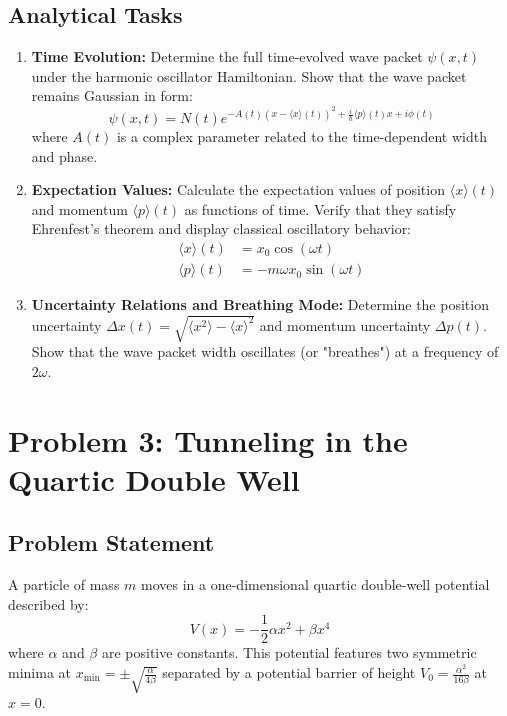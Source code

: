 \documentclass[11pt,a4paper]{article}
\begin{document}
\subsection*{Analytical Tasks}
\begin{enumerate}[label=\textbf{\arabic*.}]
    \item \textbf{Time Evolution:} Determine the full time-evolved wave packet $\psi(x,t)$ under the harmonic oscillator Hamiltonian. Show that the wave packet remains Gaussian in form:
    \begin{equation}
        \psi(x,t) = N(t) e^{-A(t)(x - \langle x \rangle(t))^2 + \frac{i}{\hbar} \langle p \rangle(t) x + i \phi(t)}
    \end{equation}
    where $A(t)$ is a complex parameter related to the time-dependent width and phase.

    \item \textbf{Expectation Values:} Calculate the expectation values of position $\langle x \rangle(t)$ and momentum $\langle p \rangle(t)$ as functions of time. Verify that they satisfy Ehrenfest's theorem and display classical oscillatory behavior:
    \begin{align}
        \langle x \rangle(t) &= x_0 \cos(\omega t) \\
        \langle p \rangle(t) &= -m\omega x_0 \sin(\omega t)
    \end{align}

    \item \textbf{Uncertainty Relations and Breathing Mode:} 
    Determine the position uncertainty $\Delta x(t) = \sqrt{\langle x^2 \rangle - \langle x \rangle^2}$ and momentum uncertainty $\Delta p(t)$. Show that the wave packet width oscillates (or "breathes") at a frequency of $2\omega$.
\end{enumerate}

\newpage

\section{Problem 3: Tunneling in the Quartic Double Well}
\label{sec:problem3}

\subsection*{Problem Statement}
A particle of mass $m$ moves in a one-dimensional quartic double-well potential described by:
\begin{equation}
    V(x) = -\frac{1}{2}\alpha x^2 + \beta x^4
\end{equation}
where $\alpha$ and $\beta$ are positive constants. This potential features two symmetric minima at $x_{\text{min}} = \pm \sqrt{\frac{\alpha}{4\beta}}$ separated by a potential barrier of height $V_0 = \frac{\alpha^2}{16\beta}$ at $x = 0$.
\end{document}
